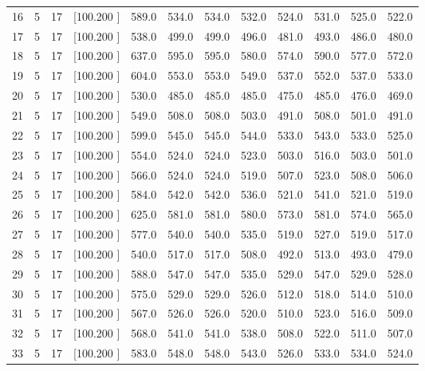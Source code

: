 \documentclass[12pt,a4paper]{article}
\begin{document}
\begin{center}
{\begin{tabular}{r r r r r r r r r r r r}
  16&  5& 17&[100.200   ]&   589.0&   534.0&   534.0&   532.0&   524.0&   531.0&   525.0&   522.0\\[-0.02in]
  17&  5& 17&[100.200   ]&   538.0&   499.0&   499.0&   496.0&   481.0&   493.0&   486.0&   480.0\\[-0.02in]
  18&  5& 17&[100.200   ]&   637.0&   595.0&   595.0&   580.0&   574.0&   590.0&   577.0&   572.0\\[-0.02in]
  19&  5& 17&[100.200   ]&   604.0&   553.0&   553.0&   549.0&   537.0&   552.0&   537.0&   533.0\\[-0.02in]
  20&  5& 17&[100.200   ]&   530.0&   485.0&   485.0&   485.0&   475.0&   485.0&   476.0&   469.0\\[-0.02in]
  21&  5& 17&[100.200   ]&   549.0&   508.0&   508.0&   503.0&   491.0&   508.0&   501.0&   491.0\\[-0.02in]
  22&  5& 17&[100.200   ]&   599.0&   545.0&   545.0&   544.0&   533.0&   543.0&   533.0&   525.0\\[-0.02in]
  23&  5& 17&[100.200   ]&   554.0&   524.0&   524.0&   523.0&   503.0&   516.0&   503.0&   501.0\\[-0.02in]
  24&  5& 17&[100.200   ]&   566.0&   524.0&   524.0&   519.0&   507.0&   523.0&   508.0&   506.0\\[-0.02in]
  25&  5& 17&[100.200   ]&   584.0&   542.0&   542.0&   536.0&   521.0&   541.0&   521.0&   519.0\\[-0.02in]
  26&  5& 17&[100.200   ]&   625.0&   581.0&   581.0&   580.0&   573.0&   581.0&   574.0&   565.0\\[-0.02in]
  27&  5& 17&[100.200   ]&   577.0&   540.0&   540.0&   535.0&   519.0&   527.0&   519.0&   517.0\\[-0.02in]
  28&  5& 17&[100.200   ]&   540.0&   517.0&   517.0&   508.0&   492.0&   513.0&   493.0&   479.0\\[-0.02in]
  29&  5& 17&[100.200   ]&   588.0&   547.0&   547.0&   535.0&   529.0&   547.0&   529.0&   528.0\\[-0.02in]
  30&  5& 17&[100.200   ]&   575.0&   529.0&   529.0&   526.0&   512.0&   518.0&   514.0&   510.0\\[-0.02in]
  31&  5& 17&[100.200   ]&   567.0&   526.0&   526.0&   520.0&   510.0&   523.0&   516.0&   509.0\\[-0.02in]
  32&  5& 17&[100.200   ]&   568.0&   541.0&   541.0&   538.0&   508.0&   522.0&   511.0&   507.0\\[-0.02in]
  33&  5& 17&[100.200   ]&   583.0&   548.0&   548.0&   543.0&   526.0&   533.0&   534.0&   524.0\\[-0.02in]

\end{tabular}}
\end{center}
\end{document}
